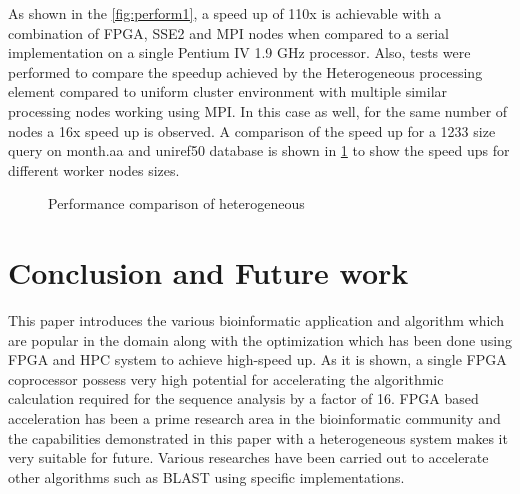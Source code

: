 \documentclass[12pt,twoside]{article}
\begin{document}
As shown in the \cref{fig:perform1}, a speed up of 110x is achievable with a combination of FPGA, SSE2 and MPI nodes when compared
to a serial implementation on a single Pentium IV 1.9 GHz processor. Also, tests were performed to compare the speedup achieved by the 
Heterogeneous processing element compared to uniform cluster environment with multiple similar processing nodes working using MPI.
In this case as well, for the same number of nodes a 16x speed up is observed. A comparison of the speed up for a 1233 size query on month.aa and 
uniref50 database is shown in \cref{fig:perform2} to show the speed ups for different worker nodes sizes.

\begin{figure}[h]%
    \centering
    \caption{Performance comparison of heterogeneous \cite[Figure 12 (e,f)]{meng_high-performance_2010}}
    \label{fig:perform2}
\end{figure}

\section{Conclusion and Future work}
\label{sec:concl}

This paper introduces the various bioinformatic application and algorithm which are popular in the domain along with the optimization
which has been done using FPGA and HPC system to achieve high-speed up. As it is shown, a single FPGA coprocessor
possess very high potential for accelerating the algorithmic calculation required for the sequence analysis by a factor of 16. FPGA based 
acceleration has been a prime research area in the bioinformatic community and the capabilities demonstrated in this paper with a heterogeneous
system makes it very suitable for future. Various researches have been carried out to accelerate other algorithms such as BLAST using
specific implementations.
\end{document}
